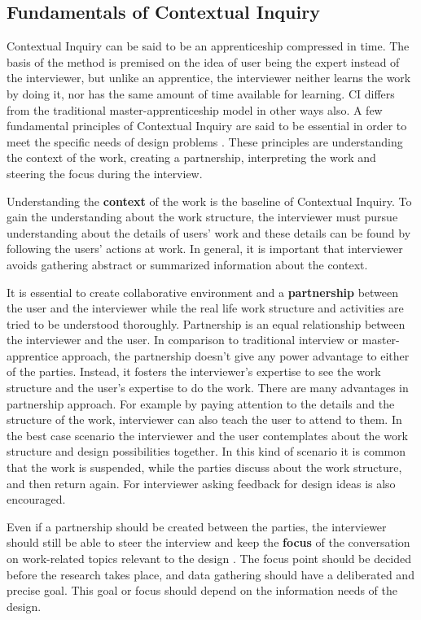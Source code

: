 \documentclass[12pt,a4paper,oneside,pdftex]{report}
\begin{document}
\subsection{Fundamentals of Contextual Inquiry}
Contextual Inquiry can be said to be an apprenticeship compressed in time. The basis of the method is premised on the idea of user being the expert instead of the interviewer, but unlike an apprentice, the interviewer neither learns the work by doing it, nor has the same amount of time available for learning. \cite{RefWorks:21} CI differs from the traditional master-apprenticeship model in other ways also. A few fundamental principles of Contextual Inquiry are said to be essential in order to meet the specific needs of design problems \cite{RefWorks:21, RefWorks:22}.  These principles are understanding the context of the work, creating a partnership, interpreting the work and steering the focus during the interview. \cite{RefWorks:21, RefWorks:28}

Understanding the \textbf{context} of the work is the baseline of Contextual Inquiry. To gain the understanding about the work structure, the interviewer must pursue understanding about the details of users' work and these details can be found by following the users' actions at work. In general, it is important that interviewer avoids gathering abstract or summarized information about the context.\cite{RefWorks:21}

It is essential to create collaborative environment and a \textbf{partnership} between the user and the interviewer while the real life work structure and activities are tried to be understood thoroughly. Partnership is an equal relationship between the interviewer and the user. In comparison to traditional interview or master-apprentice approach, the partnership doesn't give any power advantage to either of the parties. Instead, it fosters the interviewer's expertise to see the work structure and the user's expertise to do the work. There are many advantages in partnership approach. For example by paying attention to the details and the structure of the work, interviewer can also teach the user to attend to them. In the best case scenario the interviewer and the user contemplates about the work structure and design possibilities together. In this kind of scenario it is common that the work is suspended, while the parties discuss about the work structure, and then return again. For interviewer asking feedback for design ideas is also encouraged.\cite{RefWorks:21}

Even if a partnership should be created between the parties, the interviewer should still be able to steer the interview and keep the \textbf{focus} of the conversation on work-related topics relevant to the design \cite{RefWorks:21}. The focus point should be decided before the research takes place, and data gathering should have a deliberated and precise goal. This goal or focus should depend on the information needs of the design.\cite{RefWorks:22}
\end{document}
